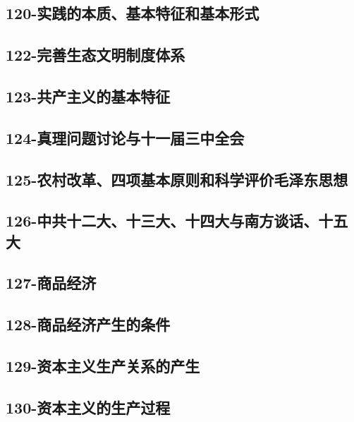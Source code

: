 \subsection{120-实践的本质、基本特征和基本形式}

\subsection{122-完善生态文明制度体系}

\subsection{123-共产主义的基本特征}

\subsection{124-真理问题讨论与十一届三中全会}

\subsection{125-农村改革、四项基本原则和科学评价毛泽东思想}

\subsection{126-中共十二大、十三大、十四大与南方谈话、十五大}

\subsection{127-商品经济}

\subsection{128-商品经济产生的条件}

\subsection{129-资本主义生产关系的产生}

\subsection{130-资本主义的生产过程}

